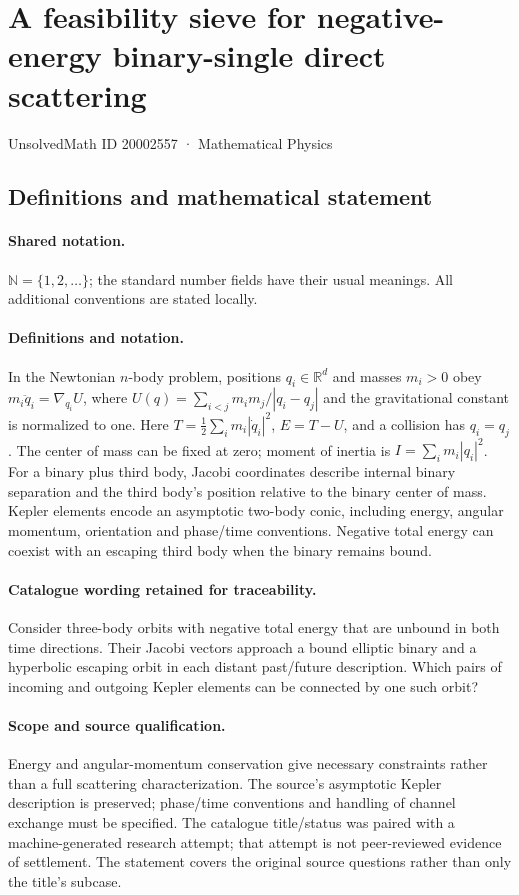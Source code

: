 \documentclass[11pt]{article}
\begin{document}
\setcounter{section}{20002556}
\section{A feasibility sieve for negative-energy binary-single direct scattering}\label{20002557}
{\small UnsolvedMath ID 20002557 · Mathematical Physics}
\subsection{Definitions and mathematical statement}

\paragraph{Shared notation.}$\mathbb N=\{1,2,\ldots\}$; the standard number fields have their usual meanings. All additional conventions are stated locally.


\paragraph{Definitions and notation.}In the Newtonian $n$-body problem, positions $q_i\in\mathbb R^d$ and masses $m_i>0$ obey $m_i\ddot q_i=\nabla_{q_i}U$, where $U(q)=\sum_{i<j}m_im_j/|q_i-q_j|$ and the gravitational constant is normalized to one. Here $T=\tfrac12\sum_i m_i|\dot q_i|^2$, $E=T-U$, and a collision has $q_i=q_j$. The center of mass can be fixed at zero; moment of inertia is $I=\sum_i m_i|q_i|^2$. For a binary plus third body, Jacobi coordinates describe internal binary separation and the third body’s position relative to the binary center of mass. Kepler elements encode an asymptotic two-body conic, including energy, angular momentum, orientation and phase/time conventions. Negative total energy can coexist with an escaping third body when the binary remains bound.

\paragraph{Catalogue wording retained for traceability.}
Consider three-body orbits with negative total energy that are unbound in both time directions. Their Jacobi vectors approach a bound elliptic binary and a hyperbolic escaping orbit in each distant past/future description. Which pairs of incoming and outgoing Kepler elements can be connected by one such orbit?
\paragraph{Scope and source qualification.}Energy and angular-momentum conservation give necessary constraints rather than a full scattering characterization. The source’s asymptotic Kepler description is preserved; phase/time conventions and handling of channel exchange must be specified. The catalogue title/status was paired with a machine-generated research attempt; that attempt is not peer-reviewed evidence of settlement. The statement covers the original source questions rather than only the title’s subcase.
\end{document}
